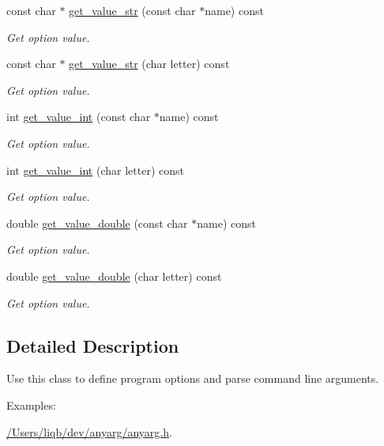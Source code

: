 {\bf }\par
\begin{DoxyCompactItemize}
\item 
const char $\ast$ \hyperlink{class_anyarg_a9788b24659c4b7ab69cfb8b1f55f1c15}{get\+\_\+value\+\_\+str} (const char $\ast$name) const 
\begin{DoxyCompactList}\small\item\em Get option value. \end{DoxyCompactList}\item 
const char $\ast$ \hyperlink{class_anyarg_a8b5d891a9e146c17cd4d8038c5265fcc}{get\+\_\+value\+\_\+str} (char letter) const 
\begin{DoxyCompactList}\small\item\em Get option value. \end{DoxyCompactList}\item 
int \hyperlink{class_anyarg_ae254a7571efbf058ad98fcd00a176470}{get\+\_\+value\+\_\+int} (const char $\ast$name) const 
\begin{DoxyCompactList}\small\item\em Get option value. \end{DoxyCompactList}\item 
int \hyperlink{class_anyarg_a2c45edbcd6de87992c227c3994eb7e72}{get\+\_\+value\+\_\+int} (char letter) const 
\begin{DoxyCompactList}\small\item\em Get option value. \end{DoxyCompactList}\item 
double \hyperlink{class_anyarg_a8d46bd713bb7bc5bd303e23afd5609d1}{get\+\_\+value\+\_\+double} (const char $\ast$name) const 
\begin{DoxyCompactList}\small\item\em Get option value. \end{DoxyCompactList}\item 
double \hyperlink{class_anyarg_ad607e8d76b475ff3c5a9ccb4032258d7}{get\+\_\+value\+\_\+double} (char letter) const 
\begin{DoxyCompactList}\small\item\em Get option value. \end{DoxyCompactList}\end{DoxyCompactItemize}



\subsection{Detailed Description}
Use this class to define program options and parse command line arguments. \begin{Desc}
\item[Examples\+: ]\par
\hyperlink{_2_users_2liqb_2dev_2anyarg_2anyarg_8h-example}{/\+Users/liqb/dev/anyarg/anyarg.\+h}.\end{Desc}


